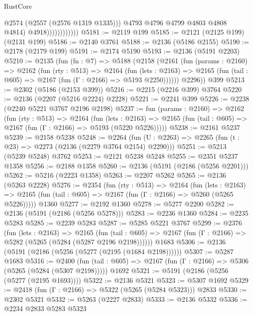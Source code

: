 \begin{lexlean}{RustCore}
\begin{coremodule}
                                @2574
                                (@2557 (@2576 @1319 @1335)))
                              @4793
                              @4796
                              @4799
                              @4803
                              @4808
                              @4814)
                            @4918))))))))))))
@5181 := @2119 @199
@5185 := @2121 (@2125 @199) (@2131 @199)
@5186 := @2140 @3761
@5188 := @2136 (@5186 @2155)
@5190 := @2178 (@2179 @199)
@5191 := @2174 @5190
@5193 := @2136 (@5191 @2203)
@5210 := @2135
    (fun (fn : @7) =>
    @5188
      (@2158
        (@2161
          (fun (params : @2160) =>
          @2162
            (fun (rty : @513) =>
            @2164
              (fun (lets : @2163) =>
              @2165 (fun (tail : @605) => @2167 (fun (Γ : @2166) => @5193 @2250))))))
        @2296))
    @399
@5213 := @2302 (@5186 (@2153 @399))
@5216 := @2215 (@2216 @399) @3764
@5220 := @2136 (@2207 (@5216 @2224) @2228)
@5221 := @2241 @399
@5226 := @2238 (@2240 @5221 @3767 @2196 @2198)
@5237 := fun (params : @2160) =>
  @2162
    (fun (rty : @513) =>
    @2164
      (fun (lets : @2163) =>
      @2165 (fun (tail : @605) => @2167 (fun (Γ : @2166) => @5193 (@5220 @5226)))))
@5238 := @2161 @5237
@5239 := @2158 @5238
@5248 := @2264 (fun (U : @2263) => @2265 (fun (t : @23) => @2273 (@2136 (@2279 @3764 @2154) @2290)))
@5251 := @5213 (@5239 @5248) @3762
@5253 := @2121 @5238 @5248
@5255 := @2351 @5237 @1358
@5256 := @2188 @1358
@5260 := @2136 (@5191 (@2186 (@5256 @2201)))
@5262 := @5216 (@2223 @1358)
@5263 := @2207 @5262
@5265 := @2136 (@5263 @2228)
@5276 := @2354
    (fun (rty : @513) =>
    @2164
      (fun (lets : @2163) =>
      @2165 (fun (tail : @605) => @2167 (fun (Γ : @2166) => @5260 (@5265 @5226)))))
    @1360
@5277 := @2192 @1360
@5278 := @5277 @2200
@5282 := @2136 (@5191 (@2186 (@5256 @5278)))
@5283 := @2236 @1360
@5284 := @2235 @5283
@5285 := @2239 @5283
@5287 := @5285 @5221 @3767
@5299 := @2376
    (fun (lets : @2163) =>
    @2165
      (fun (tail : @605) => @2167 (fun (Γ : @2166) => @5282 (@5265 (@5284 (@5287 @2196 @2198))))))
    @1683
@5306 := @2136 (@5191 (@2186 (@5256 (@5277 (@2195 (@1684 @2198))))))
@5307 := @5287 @1683
@5316 := @2400
    (fun (tail : @605) => @2167 (fun (Γ : @2166) => @5306 (@5265 (@5284 (@5307 @2198)))))
    @1692
@5321 := @5191 (@2186 (@5256 (@5277 (@2195 @1693))))
@5322 := @2136 @5321
@5323 := @5307 @1692
@5329 := @2418 (fun (Γ : @2166) => @5322 (@5265 (@5284 @5323))) @2833
@5330 := @2302 @5321
@5332 := @5263 (@2227 @2833)
@5333 := @2136 @5332
@5336 := @2234 @2833 @5283 @5323

\end{coremodule}
\end{lexlean}
